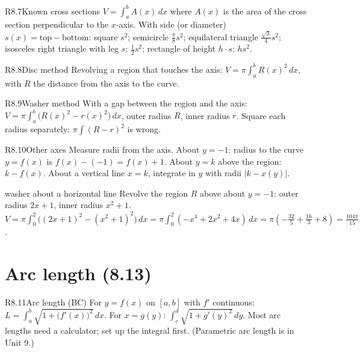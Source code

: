 \documentclass{apcalc}
\begin{document}
\begin{rulebox}{R8.7}{Known cross sections}
$V=\int_a^bA(x)\,dx$ where $A(x)$ is the area of the cross section perpendicular to the $x$-axis. With side (or diameter) $s(x)=\text{top}-\text{bottom}$: square $s^2$; semicircle $\frac\pi8s^2$; equilateral triangle $\frac{\sqrt3}{4}s^2$; isosceles right triangle with leg $s$: $\frac12s^2$; rectangle of height $h\cdot s$: $hs^2$.
\end{rulebox}

\begin{rulebox}{R8.8}{Disc method}
Revolving a region that touches the axis: $V=\pi\int_a^bR(x)^2\,dx$, with $R$ the distance from the axis to the curve.
\end{rulebox}

\begin{rulebox}{R8.9}{Washer method}
With a gap between the region and the axis: $V=\pi\int_a^b\big(R(x)^2-r(x)^2\big)\,dx$, outer radius $R$, inner radius $r$. Square each radius separately: $\pi\int(R-r)^2$ is wrong.
\end{rulebox}

\begin{rulebox}{R8.10}{Other axes}
Measure radii from the axis. About $y=-1$: radius to the curve $y=f(x)$ is $f(x)-(-1)=f(x)+1$. About $y=k$ above the region: $k-f(x)$. About a vertical line $x=k$, integrate in $y$ with radii $|k-x(y)|$.
\end{rulebox}

\begin{example}{washer about a horizontal line}
Revolve the region $R$ above about $y=-1$: outer radius $2x+1$, inner radius $x^2+1$.
$V=\pi\int_0^2\big((2x+1)^2-(x^2+1)^2\big)\,dx=\pi\int_0^2(-x^4+2x^2+4x)\,dx=\pi\left(-\frac{32}{5}+\frac{16}{3}+8\right)=\frac{104\pi}{15}$. 
\end{example}

\section{Arc length (8.13)}

\begin{rulebox}{R8.11}{Arc length (BC)}
For $y=f(x)$ on $[a,b]$ with $f'$ continuous: $L=\displaystyle\int_a^b\sqrt{1+\big(f'(x)\big)^2}\,dx$. For $x=g(y)$: $\int_c^d\sqrt{1+g'(y)^2}\,dy$. Most arc lengths need a calculator; set up the integral first. (Parametric arc length is in Unit 9.)
\end{rulebox}
\end{document}
